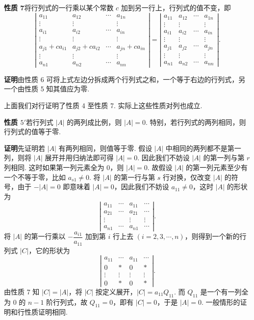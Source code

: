 \documentclass[UTF8,12pt,a4paper,fontset=fandol]{ctexart}
\begin{document}
\noindent\textbf{性质 7}\quad 将行列式的一行乘以某个常数 $c$ 加到另一行上，行列式的值不变，即
\[
\left|\begin{array}{cccc}
a_{11} & a_{12} & \cdots & a_{1n}\\
\vdots & \vdots & & \vdots\\
a_{i1} & a_{i2} & \cdots & a_{in}\\
\vdots & \vdots & & \vdots\\
a_{j1}+ca_{i1} & a_{j2}+ca_{i2} & \cdots & a_{jn}+ca_{in}\\
\vdots & \vdots & & \vdots\\
a_{n1} & a_{n2} & \cdots & a_{nn}
\end{array}\right|
=
\left|\begin{array}{cccc}
a_{11} & a_{12} & \cdots & a_{1n}\\
\vdots & \vdots & & \vdots\\
a_{i1} & a_{i2} & \cdots & a_{in}\\
\vdots & \vdots & & \vdots\\
a_{j1} & a_{j2} & \cdots & a_{jn}\\
\vdots & \vdots & & \vdots\\
a_{n1} & a_{n2} & \cdots & a_{nn}
\end{array}\right|.
\]

\noindent\textbf{证明}\quad 由性质 6 可将上式左边分拆成两个行列式之和，一个等于右边的行列式，另一个由性质 5 知其值应为零.

上面我们对行证明了性质 4 至性质 7. 实际上这些性质对列也成立.

\noindent\textbf{性质 $5'$}\quad 若行列式 $|A|$ 的两列成比例，则 $|A|=0$. 特别，若行列式的两列相同，则行列式的值等于零.

\noindent\textbf{证明}\quad 先证明若 $|A|$ 有两列相同，则值等于零. 假设 $|A|$ 中相同的两列都不是第一列，则将 $|A|$ 展开并用归纳法即可得 $|A|=0$. 因此我们不妨设 $|A|$ 的第一列与第 $r$ 列相同. 这时如果第一列元素全为 0，则 $|A|=0$. 故假设 $|A|$ 的第一列元素至少有一个不等于零，比如 $a_{s1}\ne0$. 将 $|A|$ 的第一行与第 $s$ 行对换，仅改变 $|A|$ 的符号，由于 $-|A|=0$ 即意味着 $|A|=0$，因此我们不妨设 $a_{11}\ne0$，这时 $|A|$ 的形状为
\[
\left|\begin{array}{ccccc}
a_{11} & \cdots & a_{11} & \cdots\\
a_{21} & \cdots & a_{21} & \cdots\\
\vdots & & \vdots & \vdots\\
a_{n1} & \cdots & a_{n1} & \cdots
\end{array}\right|.
\]
将 $|A|$ 的第一行乘以 $-\dfrac{a_{i1}}{a_{11}}$ 加到第 $i$ 行上去 $(i=2,3,\cdots,n)$，则得到一个新的行列式 $|C|$，它的形状为
\[
\left|\begin{array}{ccccc}
a_{11} & \cdots & a_{11} & \cdots\\
0 & * & 0 & *\\
\vdots & \vdots & \vdots & \vdots\\
0 & * & 0 & *
\end{array}\right|.
\]
由性质 7 知 $|C|=|A|$，将 $|C|$ 按定义展开，$|C|=a_{11}Q_{11}$. 而 $Q_{11}$ 是一个有一列全为 0 的 $n-1$ 阶行列式，故 $Q_{11}=0$，即有 $|C|=0$，于是 $|A|=0$. 一般情形的证明和行性质证明相同.
\end{document}
